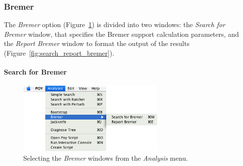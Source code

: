 \subsubsection{Bremer}

The \emph{Bremer} option (Figure~\ref{fig:search_for_bermer_menu}) is divided into two windows: the \emph{Search for Bremer} window, that specifies the Bremer support \cite{Bremer1988, Kallersjoetal1992} calculation parameters, and the \emph{Report Bremer} window to format the output of the results (Figure~\ref{fig:search_report_bremer}). 

\paragraph{Search for Bremer}

\begin{figure}[htpb]
    \begin{center}
        \includegraphics[width=0.65\textwidth]{doc/figures/searchforbremer_menu.jpg}
    \end{center}
    \caption{ Selecting the \emph{Bremer} windows from the \emph{Analysis} menu.}
    \label{fig:search_for_bermer_menu}
\end{figure}

